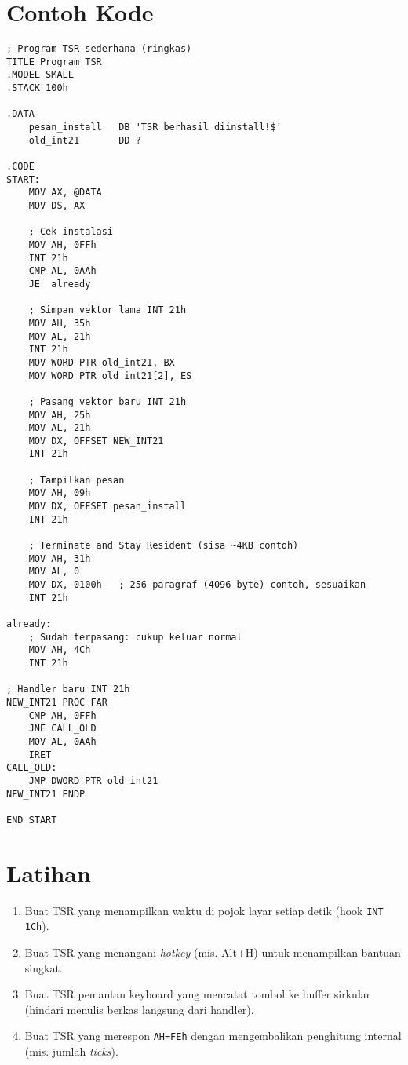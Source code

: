 \section{Contoh Kode}
\begin{verbatim}
; Program TSR sederhana (ringkas)
TITLE Program TSR
.MODEL SMALL
.STACK 100h

.DATA
    pesan_install   DB 'TSR berhasil diinstall!$'
    old_int21       DD ?

.CODE
START:
    MOV AX, @DATA
    MOV DS, AX

    ; Cek instalasi
    MOV AH, 0FFh
    INT 21h
    CMP AL, 0AAh
    JE  already

    ; Simpan vektor lama INT 21h
    MOV AH, 35h
    MOV AL, 21h
    INT 21h
    MOV WORD PTR old_int21, BX
    MOV WORD PTR old_int21[2], ES

    ; Pasang vektor baru INT 21h
    MOV AH, 25h
    MOV AL, 21h
    MOV DX, OFFSET NEW_INT21
    INT 21h

    ; Tampilkan pesan
    MOV AH, 09h
    MOV DX, OFFSET pesan_install
    INT 21h

    ; Terminate and Stay Resident (sisa ~4KB contoh)
    MOV AH, 31h
    MOV AL, 0
    MOV DX, 0100h   ; 256 paragraf (4096 byte) contoh, sesuaikan
    INT 21h

already:
    ; Sudah terpasang: cukup keluar normal
    MOV AH, 4Ch
    INT 21h

; Handler baru INT 21h
NEW_INT21 PROC FAR
    CMP AH, 0FFh
    JNE CALL_OLD
    MOV AL, 0AAh
    IRET
CALL_OLD:
    JMP DWORD PTR old_int21
NEW_INT21 ENDP

END START
\end{verbatim}

\section{Latihan}
\begin{enumerate}
  \item Buat TSR yang menampilkan waktu di pojok layar setiap detik (hook \texttt{INT 1Ch}).
  \item Buat TSR yang menangani \textit{hotkey} (mis. Alt+H) untuk menampilkan bantuan singkat.
  \item Buat TSR pemantau keyboard yang mencatat tombol ke buffer sirkular (hindari menulis berkas langsung dari handler).
  \item Buat TSR yang merespon \texttt{AH=FEh} dengan mengembalikan penghitung internal (mis. jumlah \textit{ticks}).
\end{enumerate}

